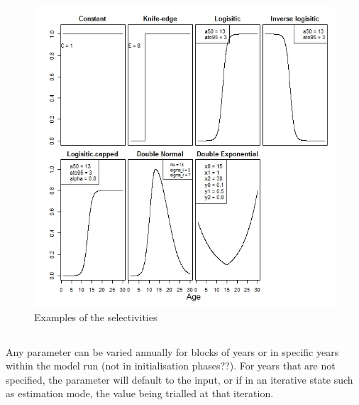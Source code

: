 %
%

\begin{figure}[H]
	\includegraphics[scale = 0.7]{Figures/Selectivities.jpeg}
	\caption{Examples of the selectivities}
	\label{fig:select examples}
\end{figure}


\subsection{\label{sec:time_var}}

Any parameter can be varied annually for blocks of years or in specific years within the model run (not in initialisation phases??). For years that are not specified, the parameter will default to the input, or if in an iterative state such as estimation mode, the value being trialled at that iteration.

